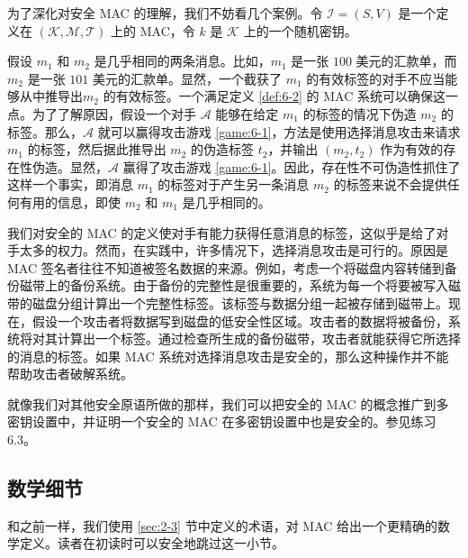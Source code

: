 为了深化对安全 MAC 的理解，我们不妨看几个案例。令 $\mathcal{I}=(S,V)$ 是一个定义在 $(\mathcal{K},\mathcal{M},\mathcal{T})$ 上的 MAC，令 $k$ 是 $\mathcal{K}$ 上的一个随机密钥。

\begin{example}\label{exmp:6-3}
假设 $m_1$ 和 $m_2$ 是几乎相同的两条消息。比如，$m_1$ 是一张 $100$ 美元的汇款单，而 $m_2$ 是一张 $101$ 美元的汇款单。显然，一个截获了 $m_1$ 的有效标签的对手不应当能够从中推导出$m_2$ 的有效标签。一个满足定义 \ref{def:6-2} 的 MAC 系统可以确保这一点。为了了解原因，假设一个对手 $\mathcal{A}$ 能够在给定 $m_1$ 的标签的情况下伪造 $m_2$ 的标签。那么，$\mathcal{A}$ 就可以赢得攻击游戏 \ref{game:6-1}，方法是使用选择消息攻击来请求 $m_1$ 的标签，然后据此推导出 $m_2$ 的伪造标签 $t_2$，并输出 $(m_2,t_2)$ 作为有效的存在性伪造。显然，$\mathcal{A}$ 赢得了攻击游戏 \ref{game:6-1}。因此，存在性不可伪造性抓住了这样一个事实，即消息 $m_1$ 的标签对于产生另一条消息 $m_2$ 的标签来说不会提供任何有用的信息，即使 $m_2$ 和 $m_1$ 是几乎相同的。
\end{example}

\begin{example}\label{exmp:6-4}
我们对安全的 MAC 的定义使对手有能力获得任意消息的标签，这似乎是给了对手太多的权力。然而，在实践中，许多情况下，选择消息攻击是可行的。原因是 MAC 签名者往往不知道被签名数据的来源。例如，考虑一个将磁盘内容转储到备份磁带上的备份系统。由于备份的完整性是很重要的，系统为每一个将要被写入磁带的磁盘分组计算出一个完整性标签。该标签与数据分组一起被存储到磁带上。现在，假设一个攻击者将数据写到磁盘的低安全性区域。攻击者的数据将被备份，系统将对其计算出一个标签。通过检查所生成的备份磁带，攻击者就能获得它所选择的消息的标签。如果 MAC 系统对选择消息攻击是安全的，那么这种操作并不能帮助攻击者破解系统。
\end{example}

\begin{remark}\label{remark:6-1}
就像我们对其他安全原语所做的那样，我们可以把安全的 MAC 的概念推广到多密钥设置中，并证明一个安全的 MAC 在多密钥设置中也是安全的。参见练习 6.3。
\end{remark}

\subsection{数学细节}

和之前一样，我们使用 \ref{sec:2-3} 节中定义的术语，对 MAC 给出一个更精确的数学定义。读者在初读时可以安全地跳过这一小节。

